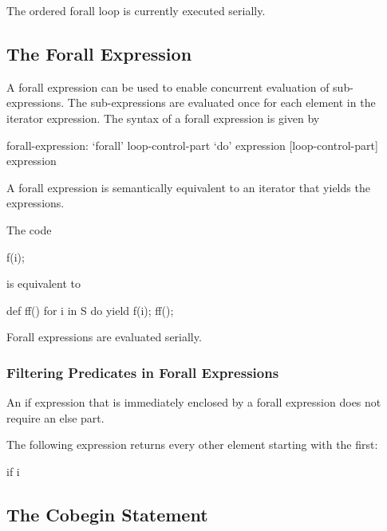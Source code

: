 \begin{status}
The ordered forall loop is currently executed serially.
\end{status}

\subsection{The Forall Expression}
\label{Forall_Expressions}

A forall expression can be used to enable concurrent evaluation of
sub-expressions.  The sub-expressions are evaluated once for each
element in the iterator expression.  The syntax of a forall expression
is given by
\begin{syntax}
forall-expression:
   `forall' loop-control-part `do' expression
   [loop-control-part] expression
\end{syntax}

A forall expression is semantically equivalent to an iterator that
yields the expressions.

\begin{example}
The code
\begin{chapel}
[i in S] f(i);
\end{chapel}
is equivalent to
\begin{chapel}
def ff() {
  for i in S do
    yield f(i);
}
ff();
\end{chapel}
\end{example}

\begin{status}
Forall expressions are evaluated serially.
\end{status}

\subsubsection{Filtering Predicates in Forall Expressions}
\label{Filtering_Predicates_Forall}

An if expression that is immediately enclosed by a forall expression
does not require an else part.
\begin{example}
The following expression returns every other element starting with the
first:
\begin{chapel}
[i in 1..s.length] if i %
\end{chapel}
\end{example}

\subsection{The Cobegin Statement}
\label{Cobegin}

